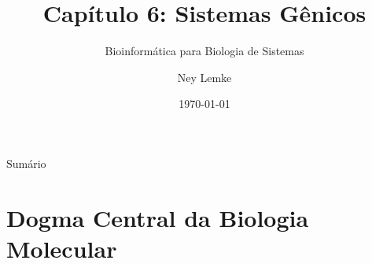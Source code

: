 


\usepackage{seqsplit}

\title[Cap. 6: Sistemas Gênicos]{Capítulo 6: Sistemas Gênicos}
\subtitle{Bioinformática para Biologia de Sistemas}
\author{Ney Lemke}
\date{\today}



\begin{frame}{}
\titlepage
\end{frame}

\begin{frame}{Sumário}
\tableofcontents
\end{frame}

\section{Dogma Central da Biologia Molecular}


